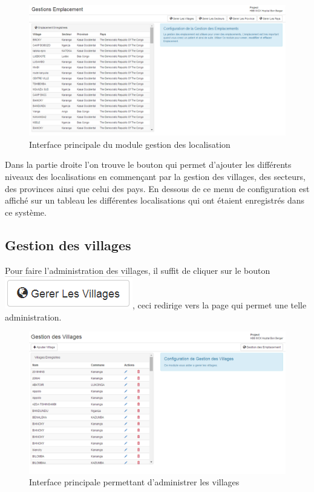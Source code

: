 \documentclass[12pt,a4paper]{report}
\begin{document}
\begin{figure}[h]
\begin{center}
\includegraphics[width=14cm]{pic/AdminLocalisation.png}
\end{center}
\caption{Interface principale du module gestion des localisation}
\label{Interface principale du module gestion des localisation}
\end{figure}

Dans la partie droite l'on trouve le bouton qui permet d'ajouter les différents niveaux des localisations en commençant par la gestion des villages, des secteurs, des provinces ainsi que celui des pays. En dessous de ce menu de configuration est affiché sur un tableau les différentes localisations qui ont étaient enregistrés dans ce système. 
\newpage
\subsection{Gestion des villages}
Pour faire l'administration des villages, il suffit de cliquer sur le bouton\\ \includegraphics[scale=0.7]{pic/GererVillage.png}, ceci redirige vers la page qui permet une telle administration.

\begin{figure}[h]
\begin{center}
\includegraphics[width=14cm]{pic/AdminVillage.png}
\end{center}
\caption{Interface principale permettant d'administrer les villages}
\label{Interface principale permettant d'administrer les villages}
\end{figure}
\end{document}
